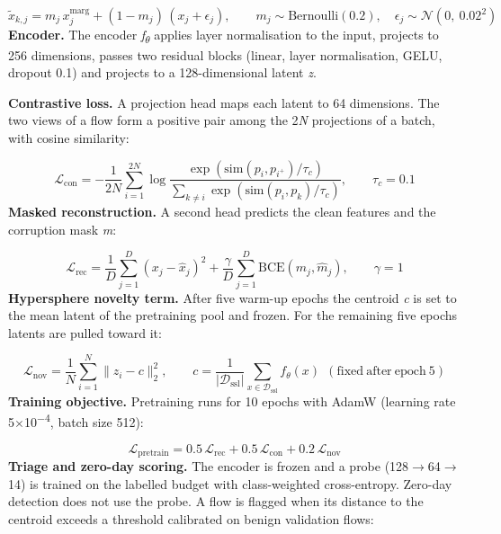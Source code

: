 \documentclass[10pt,a4paper]{article}
\begin{document}
\begin{equation}
\tilde{x}_{k,j} = m_j \, x^{\mathrm{marg}}_{j} + (1 - m_j)\,(x_j + \epsilon_j), \qquad m_j \sim \mathrm{Bernoulli}(0.2), \quad \epsilon_j \sim \mathcal{N}(0,\ 0.02^{2})
\end{equation}
\textbf{Encoder.} The encoder \textit{f\textsubscript{$\theta$}} applies layer normalisation to the input, projects to 256 dimensions, passes two residual blocks (linear, layer normalisation, GELU, dropout 0.1) and projects to a 128-dimensional latent \textit{z}.

\textbf{Contrastive loss.} A projection head maps each latent to 64 dimensions. The two views of a flow form a positive pair among the 2\textit{N} projections of a batch, with cosine similarity:

\begin{equation}
\mathcal{L}_{\mathrm{con}} = -\frac{1}{2N}\sum_{i=1}^{2N} \log \frac{\exp(\mathrm{sim}(p_i, p_{i^{+}})/\tau_c)}{\sum_{k \neq i} \exp(\mathrm{sim}(p_i, p_k)/\tau_c)}, \qquad \tau_c = 0.1
\end{equation}
\textbf{Masked reconstruction.} A second head predicts the clean features and the corruption mask \textit{m}:

\begin{equation}
\mathcal{L}_{\mathrm{rec}} = \frac{1}{D}\sum_{j=1}^{D} (x_j - \hat{x}_j)^2 + \frac{\gamma}{D}\sum_{j=1}^{D} \mathrm{BCE}(m_j, \hat{m}_j), \qquad \gamma = 1
\end{equation}
\textbf{Hypersphere novelty term.} After five warm-up epochs the centroid \textit{c} is set to the mean latent of the pretraining pool and frozen. For the remaining five epochs latents are pulled toward it:

\begin{equation}
\mathcal{L}_{\mathrm{nov}} = \frac{1}{N}\sum_{i=1}^{N} \| z_i - c \|_2^2, \qquad c = \frac{1}{|\mathcal{D}_{\mathrm{ssl}}|}\sum_{x \in \mathcal{D}_{\mathrm{ssl}}} f_\theta(x) \ \ \mathrm{(fixed\ after\ epoch\ 5)}
\end{equation}
\textbf{Training objective.} Pretraining runs for 10 epochs with AdamW (learning rate 5$\times$10\textsuperscript{$-$4}, batch size 512):

\begin{equation}
\mathcal{L}_{\mathrm{pretrain}} = 0.5\,\mathcal{L}_{\mathrm{rec}} + 0.5\,\mathcal{L}_{\mathrm{con}} + 0.2\,\mathcal{L}_{\mathrm{nov}}
\end{equation}
\textbf{Triage and zero-day scoring.} The encoder is frozen and a probe (128$\rightarrow$64$\rightarrow$14) is trained on the labelled budget with class-weighted cross-entropy. Zero-day detection does not use the probe. A flow is flagged when its distance to the centroid exceeds a threshold calibrated on benign validation flows:
\end{document}
